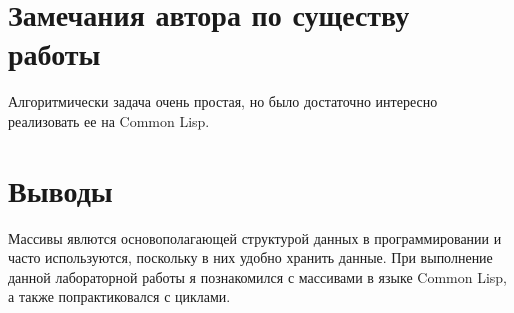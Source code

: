 \documentclass[12pt]{article}
\begin{document}
\section{Замечания автора по существу работы}
Алгоритмически задача очень простая, но было достаточно интересно реализовать ее на Common Lisp.

\section{Выводы}
Массивы явлются основополагающей структурой данных в программировании и часто используются, поскольку в них удобно хранить данные. При выполнение данной лабораторной работы я познакомился с массивами в языке Common Lisp, а также попрактиковался с циклами.
\end{document}
